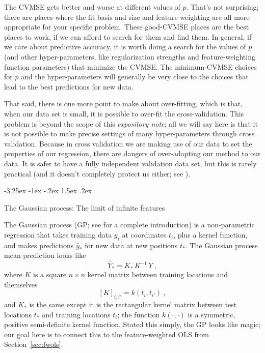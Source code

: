 \documentclass[12pt,letterpaper]{article}
\makeatletter
\renewcommand\section{\@startsection {section}{1}{\z@}%
  {-3.25ex \@plus -1ex \@minus -.2ex}%
  {1.5ex \@plus .2ex}%
  {\raggedright\normalfont\large\bfseries}}
\newcommand{\documentname}{\textsl{expository note}}
\newcommand{\sectionname}{Section}
\makeatother
\begin{document}
The CVMSE gets better and worse at different values of $p$.
That's not surprising; there are places where the fit basis and size and feature weighting are all more appropriate for your specific problem.
These good-CVMSE places are the best places to work, if we can afford to search for them and find them.
In general, if we care about predictive accuracy, it is worth doing a search for the values of $p$ (and other hyper-parameters, like regularization strengths and feature-weighting function parameters) that minimize the CVMSE.
The minimum-CVMSE choices for $p$ and the hyper-parameters will generally be very close to the choices that lead to the best predictions for new data.

That said, there is one more point to make about over-fitting, which is that, when our data set is small, it is possible to over-fit the cross-validation.
This problem is beyond the scope of this \documentname; all we will say here is that it is not possible to make precise settings of many hyper-parameters through cross validation.
Because in cross validation we are making use of our data to set the properties of our regression, there are dangers of over-adapting our method to our data.
It is safer to have a fully independent validation data set, but this is rarely practical (and it doesn't completely protect us either; see \citealt{cifar10}).



\section{The Gaussian process: The limit of infinite features}\label{sec:gp}

The Gaussian process (GP; see \citealt{gpml} for a complete introduction) is a non-parametric regression that takes training data $y_i$ at coordinates $t_i$, plus a kernel function, and makes predictions $\hat{y}_\ast$ for new data at new positions $t_\ast$.
The Gaussian process mean prediction looks like%
\begin{equation}\label{eq:gpmean}
    \hat{Y}_\ast = K_\ast\,K^{-1}\,Y
    ~,
\end{equation}
where $K$ is a square $n\times n$ kernel matrix between training locations and themselves
\begin{equation}\label{eq:Kmatrix}
    [K]_{i,i'} = k(t_i,t_{i'})
    ~,
\end{equation}
and $K_\ast$ is the same except it is the rectangular kernel matrix between test locations $t_\ast$ and training locations $t_i$;
the function $k(\cdot,\cdot)$ is a symmetric, positive semi-definite kernel function.
Stated this simply, the GP looks like magic; our goal here is to connect this to the feature-weighted OLS from \sectionname~\ref{sec:fwols}.
\end{document}

